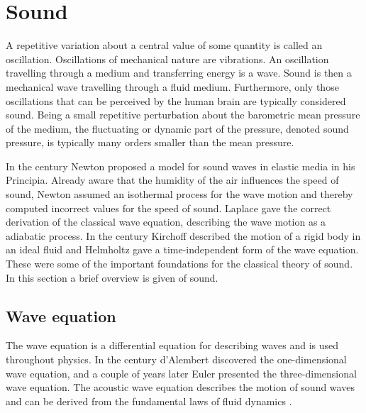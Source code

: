 \section{Sound}

A repetitive variation about a central value of some quantity is called an
oscillation. Oscillations of mechanical nature are vibrations. An
oscillation travelling through a medium and transferring energy is a wave. Sound
is then a mechanical wave travelling through a fluid medium. Furthermore, only
those oscillations that can be perceived by the human brain are typically
considered sound.
Being a small repetitive perturbation about the barometric
mean pressure of the medium, the fluctuating or dynamic part of the pressure,
denoted sound pressure, is typically many orders smaller than the mean
pressure.

In the  century Newton proposed a model for sound waves in elastic media
in his Principia. Already aware that the humidity of the air influences the
speed of sound, Newton assumed an isothermal process for the wave motion and
thereby computed incorrect values for the speed of sound. Laplace gave the
correct derivation of the classical wave equation, describing the wave motion as
a adiabatic process. In the  century Kirchoff described the motion of a
rigid body in an ideal fluid and Helmholtz gave a time-independent form of the
wave equation. These were some of the important foundations for the classical
theory of sound.
In this section a brief overview is given of sound.



\subsection{Wave equation}\label{sec:theory:sound:wave}
The wave equation is a differential equation for describing waves and is used
throughout physics. In the  century d'Alembert discovered the
one-dimensional wave equation, and a couple of years later Euler presented the
three-dimensional wave equation. The acoustic wave equation describes the motion
of sound waves and can be derived from the fundamental laws of fluid dynamics \cite{Arntzen2014a, Rienstra2017}.

